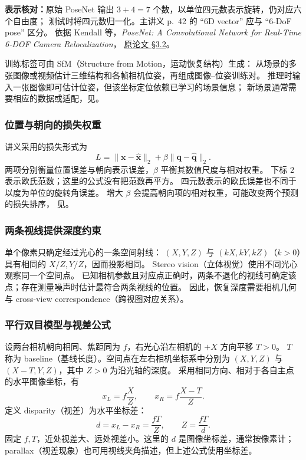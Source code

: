 \textbf{表示核对：}原始 PoseNet 输出 $3+4=7$ 个数，以单位四元数表示旋转，仍对应六个自由度；
测试时将四元数归一化。主讲义 p.~42 的 ``6D vector'' 应与 ``6-DoF pose'' 区分。
依据 Kendall 等，\emph{PoseNet: A Convolutional Network for Real-Time 6-DOF Camera Relocalization}，
\href{https://arxiv.org/abs/1505.07427}{原论文 \S3.2}。

训练标签可由 SfM（Structure from Motion，运动恢复结构）生成：
从场景的多张图像或视频估计三维结构和各帧相机位姿，再组成图像--位姿训练对。
推理时输入一张图像即可估计位姿，但该坐标定位依赖已学习的场景信息；
新场景通常需要相应的数据或适配，见。

\subsubsection*{位置与朝向的损失权重}

讲义采用的损失形式为
\[
  \boxed{L=\|\bm x-\hat{\bm x}\|_2+\beta\|\bm q-\hat{\bm q}\|_2}.
\]
两项分别衡量位置误差与朝向表示误差，$\beta$ 平衡其数值尺度与相对权重。
下标 $2$ 表示欧氏范数；这里的公式没有把范数再平方。
四元数表示的欧氏误差也不同于以度为单位的旋转角误差。
增大 $\beta$ 会提高朝向项的相对权重，可能改变两个预测的损失排序，
见。


\subsubsection*{两条视线提供深度约束}

单个像素只确定经过光心的一条空间射线：
$(X,Y,Z)$ 与 $(kX,kY,kZ)$（$k>0$）具有相同的 $X/Z,Y/Z$，因而投影相同。
Stereo vision（立体视觉）使用不同光心观察同一个空间点。
已知相机参数且对应点正确时，两条不退化的视线可确定该点；存在测量噪声时估计最符合两条视线的位置。
因此，恢复深度需要相机几何与 cross-view correspondence（跨视图对应关系）。

\subsubsection*{平行双目模型与视差公式}

设两台相机朝向相同、焦距同为 $f$，右光心沿左相机的 $+X$ 方向平移 $T>0$。
$T$ 称为 baseline（基线长度）。空间点在左右相机坐标系中分别为
$(X,Y,Z)$ 与 $(X-T,Y,Z)$，其中 $Z>0$ 为沿光轴的深度。
采用相同方向、相对于各自主点的水平图像坐标，有
\[
  x_L=f\frac XZ,\qquad x_R=f\frac{X-T}{Z}.
\]
定义 disparity（视差）为水平坐标差：
\[
  \boxed{d=x_L-x_R=\frac{fT}{Z}},\qquad
  \boxed{Z=\frac{fT}{d}}.
\]
固定 $f,T$，近处视差大、远处视差小。这里的 $d$ 是图像坐标差，通常按像素计；
parallax（视差现象）也可用视线夹角描述，但上述公式使用坐标差。

